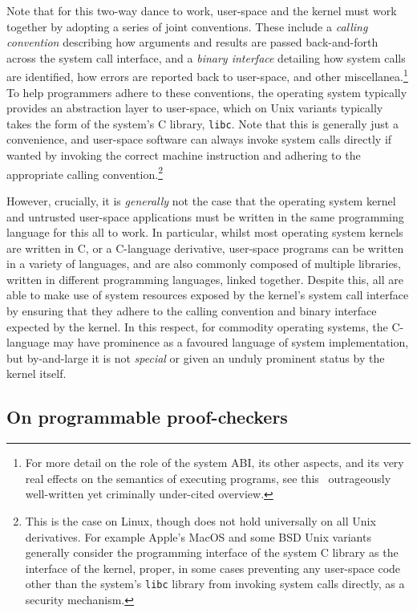\documentclass[a4paper, UKenglish, cleveref, autoref, thm-restate, colorlinks]{lipics-v2021}
\begin{document}
Note that for this two-way dance to work, user-space and the kernel must work together by adopting a series of joint conventions.
These include a \emph{calling convention} describing how arguments and results are passed back-and-forth across the system call interface, and a \emph{binary interface} detailing how system calls are identified, how errors are reported back to user-space, and other miscellanea.\footnote{For more detail on the role of the system ABI, its other aspects, and its very real effects on the semantics of executing programs, see this~\cite{DBLP:conf/oopsla/KellMS16} outrageously well-written yet criminally under-cited overview.}
To help programmers adhere to these conventions, the operating system typically provides an abstraction layer to user-space, which on Unix variants typically takes the form of the system's C library, \texttt{libc}.
Note that this is generally just a convenience, and user-space software can always invoke system calls directly if wanted by invoking the correct machine instruction and adhering to the appropriate calling convention.\footnote{This is the case on Linux, though does not hold universally on all Unix derivatives.  For example Apple's MacOS and some BSD Unix variants generally consider the programming interface of the system C library as the interface of the kernel, proper, in some cases preventing any user-space code other than the system's \texttt{libc} library from invoking system calls directly, as a security mechanism.}

However, crucially, it is \emph{generally} not the case that the operating system kernel and untrusted user-space applications must be written in the same programming language for this all to work.
In particular, whilst most operating system kernels are written in C, or a C-language derivative, user-space programs can be written in a variety of languages, and are also commonly composed of multiple libraries, written in different programming languages, linked together.
Despite this, all are able to make use of system resources exposed by the kernel's system call interface by ensuring that they adhere to the calling convention and binary interface expected by the kernel.
In this respect, for commodity operating systems, the C-language may have prominence as a favoured language of system implementation, but by-and-large it is not \emph{special} or given an unduly prominent status by the kernel itself.

\subsection{On programmable proof-checkers}
\end{document}
